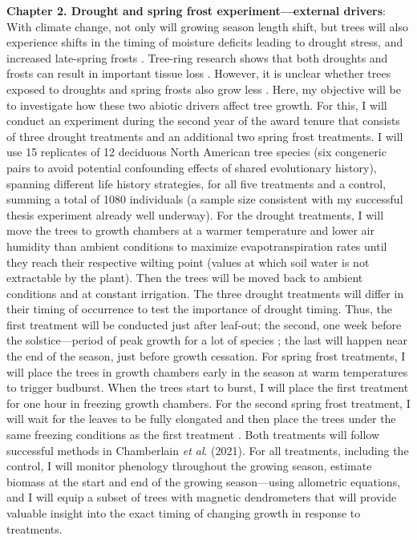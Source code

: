 \documentclass[12pt]{article}
\begin{document}
\textbf{Chapter 2. Drought and spring frost experiment---external drivers}:
With climate change, not only will growing season length shift, but trees will also experience shifts in the timing of moisture deficits leading to drought stress, and increased late-spring frosts \cite{dox_wood_2022}. Tree-ring research shows that both droughts and frosts can result in important tissue loss \cite{kramer_why_2012,baumgarten_no_2023,dandrea_winters_2019}. However, it is unclear whether trees exposed to droughts and spring frosts also grow less \cite{chamberlain_late_2021,baumgarten_no_2023,lian_summer_2020,zhang_drought_2021}.
Here, my objective will be to investigate how these two abiotic drivers affect tree growth. For this, I will conduct an experiment during the second year of the award tenure that consists of three drought treatments and an additional two spring frost treatments. I will use 15 replicates of 12 deciduous North American tree species (six congeneric pairs to avoid potential confounding effects of shared evolutionary history), spanning different life history strategies, for all five treatments and a control, summing a total of 1080 individuals (a sample size consistent with my successful thesis experiment already well underway). 
For the drought treatments, I will move the trees to growth chambers at a warmer temperature and lower air humidity than ambient conditions to maximize evapotranspiration rates until they reach their respective wilting point (values at which soil water is not extractable by the plant). Then the trees will be moved back to ambient conditions and at constant irrigation. The three drought treatments will differ in their timing of occurrence to test the importance of drought timing. Thus, the first treatment will be conducted just after leaf-out; the second, one week before the solstice---period of peak growth for a lot of species \cite{anderson-teixeira_carbon_2021,dorangeville_drought_2018,mcmahon_general_2015}; the last will happen near the end of the season, just before growth cessation. For spring frost treatments, I will place the trees in growth chambers early in the season at warm temperatures to trigger budburst. When the trees start to burst, I will place the first treatment for one hour in freezing growth chambers. For the second spring frost treatment, I will wait for the leaves to be fully elongated and then place the trees under the same freezing conditions as the first treatment \cite{zohner_increased_2018}. Both treatments will follow successful methods in Chamberlain \textit{et al}. (2021). For all treatments, including the control, I will monitor phenology throughout the growing season, estimate biomass at the start and end of the growing season---using allometric equations, and I will equip a subset of trees with magnetic dendrometers that will provide valuable insight into the exact timing of changing growth in response to treatments. 
\end{document}
